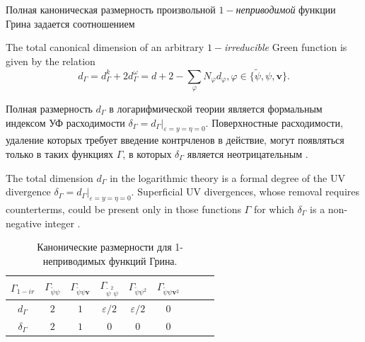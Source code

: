 \documentclass[12pt]{article}
\def\eps{\varepsilon}
\def\mv{{\bm v}}
\begin{document}
Полная каноническая размерность произвольной $1-${\it неприводимой} функции Грина задается соотношением

The total canonical dimension of an arbitrary $1-${\it irreducible} Green function
is given by the relation 
\begin{equation}
  d_\Gamma = d^k_\Gamma + 2 d^\omega_\Gamma = d + 2 -
  \sum_\varphi N_\varphi d_\varphi, \varphi\in\{\tilde{\psi}, \psi, \mv \}.
  \label{eq:def_dim}
\end{equation}

Полная размерность $d_\Gamma$ в логарифмической теории является формальным индексом УФ расходимости $\delta_\Gamma = d_\Gamma |_{\eps=y=\eta=0}$.
Поверхностные расходимости, удаление которых требует введение контрчленов в действие, могут появляться только в таких функциях $\Gamma$, в которых $\delta_\Gamma$ является неотрицательным \cite{Vasiliev}.

The total dimension $d_\Gamma$ in the logarithmic theory is a formal degree of the 
UV divergence $\delta_\Gamma = d_\Gamma |_{\eps=y=\eta=0}$. 
Superficial UV divergences, whose removal requires counterterms, could be
present only in those functions $\Gamma$ for which $\delta_\Gamma$ is
a non-negative integer \cite{Vasiliev}.

\begin{table}[h!]
  \centering
  \setlength\extrarowheight{2pt}
  \begin{tabular}{|c|c|c|c|c|c|c|c|c|}
    \hline
    $\Gamma_{1-ir}$ &  $\Gamma_{\tilde{\psi} \psi} $& $\Gamma_{\tilde{\psi} \psi \mv }$
                  & $\Gamma_{\tilde{\psi}^2 \psi} $ & $ \Gamma_{\tilde{\psi}\psi^2} $
                  & $\Gamma_{\tilde{\psi}\psi \mv^2}$                                    
   \\
   \hline
    $d_\Gamma$ & $2$ & $1$ & $\eps/2$ & $\eps/2$ & $0$
               \\
    \hline
     $\delta_\Gamma$ & $2$ & $1$ & $0$ & $0$ & $0$
               \\ \hline
  \end{tabular}
  \caption{Канонические размерности для 1-неприводимых функций Грина.}
  \label{tab:canon_green}%
\end{table}
\end{document}
